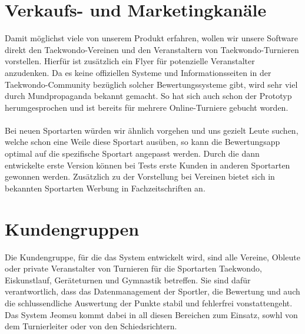 \section{Verkaufs- und Marketingkanäle}
Damit möglichst viele von unserem Produkt erfahren, wollen wir unsere Software direkt den Taekwondo-Vereinen und
den Veranstaltern von Taekwondo-Turnieren vorstellen.
Hierfür ist zusätzlich ein Flyer für potenzielle Veranstalter anzudenken.
Da es keine offiziellen Systeme und Informationsseiten in der Taekwondo-Community bezüglich solcher Bewertungssysteme
gibt, wird sehr viel durch Mundpropaganda bekannt gemacht.
So hat sich auch schon der Prototyp herumgesprochen und ist bereits für mehrere Online-Turniere gebucht worden.
\\\\
Bei neuen Sportarten würden wir ähnlich vorgehen und uns gezielt Leute suchen, welche schon eine Weile diese Sportart
	ausüben, so kann die Bewertungsapp optimal auf die spezifische Sportart angepasst werden.
Durch die dann entwickelte erste Version können bei Tests erste Kunden in anderen Sportarten gewonnen werden.
Zusätzlich zu der Vorstellung bei Vereinen bietet sich in bekannten Sportarten Werbung in Fachzeitschriften an.

\section{Kundengruppen}
Die Kundengruppe, für die das System entwickelt wird, sind alle Vereine, Obleute oder private Veranstalter von
Turnieren für die Sportarten Taekwondo, Eiskunstlauf, Geräteturnen und Gymnastik betreffen.
Sie sind dafür verantwortlich, dass das Datenmanagement der Sportler, die Bewertung und auch die schlussendliche
Auswertung der Punkte stabil und fehlerfrei vonstattengeht.
Das System Jeomsu kommt dabei in all diesen Bereichen zum Einsatz, sowhl von dem Turnierleiter oder von den
Schiedsrichtern.




